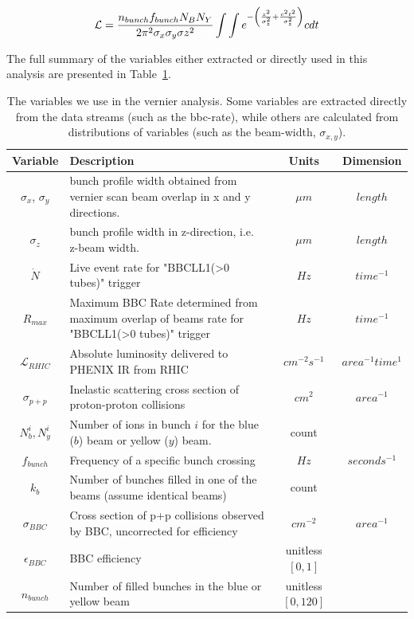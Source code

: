 \begin{equation}
\label{eq:reletivistic_beam_final} 
\mathcal{L} = {{n_{bunch} f_{bunch} N_{B} N_{Y} }\over{ 2 \pi^{2} \sigma_{x}
\sigma_{y}\sigma{z}^2}} \int \int
e^{-\left({{z^{2}}\over{\sigma_{z}^{2}}}+{{c^{2}t^{2}}\over{\sigma_{z}^{2}}}\right)} c dt
\end{equation}

The full summary of the variables either extracted or directly used in this
analysis are presented in Table~\ref{tab:ana_vars}.

\begin{table}[ht]
  \centering
  \begin{tabular}{c p{8cm} c c }
    \toprule
    \textbf{Variable} & \textbf{Description} & \textbf{Units} & \textbf{Dimension} \\
    \midrule 
    $\sigma_{x}$, $\sigma_{y}$ & bunch profile width obtained from vernier scan beam overlap in x and y directions. & $\mu m$ & $length$ \\
    $\sigma_{z}$ & bunch profile width in z-direction, i.e. z-beam width. & $\mu m$ & $length$ \\
    $\dot{N}$ & Live event rate for "BBCLL1(\textgreater0 tubes)" trigger & $Hz$ & $time^{-1}$ \\
    $R_{max}$ & Maximum BBC Rate determined from maximum overlap of beams rate for "BBCLL1(\textgreater0 tubes)" trigger & $Hz$ & $time^{-1}$ \\
    $\mathcal{L}_{RHIC}$ & Absolute luminosity delivered to PHENIX IR from RHIC & $cm^{-2}s^{-1}$ & $area^{-1}time^{1}$ \\
    $\sigma_{p+p} $ & Inelastic scattering cross section of proton-proton collisions & $cm^{2}$ & $area^{-1}$ \\
    $N_{b}^{i},N_{y}^{i}$ & Number of ions in bunch $i$ for the blue ($b$) beam or yellow ($y$) beam. & count & \\
    $f_{bunch}$ & Frequency of a specific bunch crossing & $Hz$ & $seconds^{-1}$ \\
    $k_{b}$ & Number of bunches filled in one of the beams (assume identical beams) & count & \\
    $\sigma_{BBC}$ & Cross section of p+p collisions observed by BBC,
    uncorrected for efficiency & $cm^{-2}$ & $area^{-1}$ \\
    $\epsilon_{BBC}$ & BBC efficiency & unitless $[0,1]$ & \\
    $n_{bunch}$ & Number of filled bunches in the blue or yellow beam & unitless $[0,120]$ & \\
    \bottomrule
  \end{tabular}
  \caption{
    The variables we use in the vernier analysis. Some variables are extracted
    directly from the data streams (such as the bbc-rate), while others are
    calculated from distributions of variables (such as the beam-width,
    $\sigma_{x,y}$). 
  }
  \label{tab:ana_vars}
\end{table}

